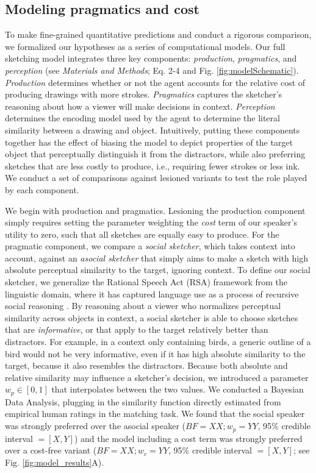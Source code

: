 \documentclass[9pt,twocolumn,twoside]{pnas-new}
\begin{document}
\subsection*{Modeling pragmatics and cost}

To make fine-grained quantitative predictions and conduct a rigorous comparison, we formalized our hypotheses as a series of computational models. Our full sketching model integrates three key components: \emph{production}, \emph{pragmatics}, and \emph{perception} (see \emph{Materials and Methods}; Eq. 2-4 and Fig. \ref{fig:modelSchematic}). \emph{Production} determines whether or not the agent accounts for the relative cost of producing drawings with more strokes. \emph{Pragmatics} captures the sketcher's reasoning about how a viewer will make decisions in context. \emph{Perception} determines the encoding model used by the agent to determine the literal similarity between a drawing and object. Intuitively, putting these components together has the effect of biasing the model to depict properties of the target object that perceptually distinguish it from the distractors, while also preferring sketches that are less costly to produce, i.e., requiring fewer strokes or less ink. We conduct a set of comparisons against lesioned variants to test the role played by each component.

We begin with production and pragmatics. Lesioning the production component simply requires setting the parameter weighting the \emph{cost} term of our speaker's utility to zero, such that all sketches are equally easy to produce. For the pragmatic component, we compare a \emph{social sketcher}, which takes context into account, against an \emph{asocial sketcher} that simply aims to make a sketch with high absolute perceptual similarity to the target, ignoring context. To define our social sketcher, we generalize the Rational Speech Act (RSA) framework from the linguistic domain, where it has captured language use as a process of recursive social reasoning \cite{stuff}. By reasoning about a viewer who normalizes perceptual similarity across objects in context, a social sketcher is able to choose sketches that are \emph{informative}, or that apply to the target relatively better than distractors. For example, in a context only containing birds, a generic outline of a bird would not be very informative, even if it has high absolute similarity to the target, because it also resembles the distractors. Because both absolute and relative similarity may influence a sketcher's decision, we introduced a parameter $w_p \in [0,1]$ that interpolates between the two values. We conducted a Bayesian Data Analysis, plugging in the similarity function directly estimated from empirical human ratings in the matching task. We found that the social speaker was strongly preferred over the asocial speaker ($BF = XX; w_p = YY$, 95\% credible interval $= [X, Y]$) and the model including a cost term was strongly preferred over a cost-free variant ($BF = XX; w_c = YY$, 95\% credible interval $=[X, Y]$; see Fig. \ref{fig:model_results}A).
\end{document}
